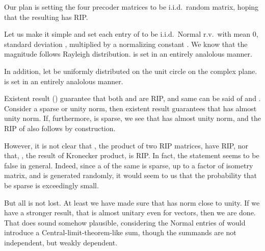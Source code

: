 \startsection [title={Restricted Isometry of Effective Beamformer}]

\startsubsection [title={Design of Beamformer Matrices}]

Our plan is setting the four precoder matrices to be i.i.d.\ random matrix, hoping that the resulting  has RIP.

Let us make it simple and set each entry of  to be i.i.d.\ Normal r.v.\ with mean 0, standard deviation , multiplied by a normalizing constant .
We know that the magnitude  follows Rayleigh distribution.
 is set in an entirely analolous manner.

In addition, let  be uniformly distributed on the unit circle on the complex plane.
 is set in an entirely analolous manner.

Existent result () guarantee that both  and  are RIP, and same can be said of  and .
Consider a sparse  or unity norm, then existent result guarantees that  has almost unity norm.
If, furthermore,  is sparse, we see that  has almost unity norm, and the RIP of  also follows by construction.

However, it is not clear that , the product of two RIP matrices, have RIP, nor that, , the result of Kronecker product, is RIP.
In fact, the statement seems to be false in general.
Indeed, since a  of the same \m {\d} is sparse, up to a factor of isometry matrix, and  is generated randomly, it would seem to us that the probability that  be sparse is exceedingly small.

But all is not lost.
At least we have made sure that  has norm close to unity.
If we have a stronger result, that  is almost unitary even for  vectors, then we are done.
That does sound somehow plausible, considering the Normal entries of  would introduce a Central-limit-theorem-like sum, though the summands are not independent, but weakly dependent.

